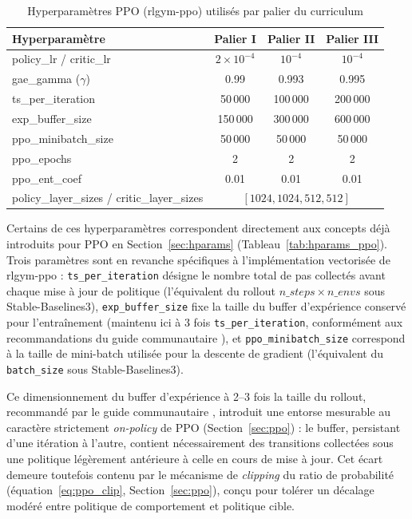 \begin{table}[h]
\centering
\small
\begin{tabular}{|l|c|c|c|}
\hline
\textbf{Hyperparamètre} & \textbf{Palier I} & \textbf{Palier II} & \textbf{Palier III} \\
\hline
policy\_lr / critic\_lr & $2 \times 10^{-4}$ & $10^{-4}$ & $10^{-4}$ \\
\hline
gae\_gamma ($\gamma$) & 0.99 & 0.993 & 0.995 \\
\hline
ts\_per\_iteration & 50\,000 & 100\,000 & 200\,000 \\
\hline
exp\_buffer\_size & 150\,000 & 300\,000 & 600\,000 \\
\hline
ppo\_minibatch\_size & 50\,000 & 50\,000 & 50\,000 \\
\hline
ppo\_epochs & 2 & 2 & 2 \\
\hline
ppo\_ent\_coef & 0.01 & 0.01 & 0.01 \\
\hline
policy\_layer\_sizes / critic\_layer\_sizes & \multicolumn{3}{c|}{$[1024, 1024, 512, 512]$} \\
\hline
\end{tabular}
\caption{Hyperparamètres PPO (rlgym-ppo) utilisés par palier du curriculum}
\label{tab:hp_ppo_curriculum}
\end{table}

Certains de ces hyperparamètres correspondent directement aux concepts déjà introduits pour PPO en Section~\ref{sec:hparams} (Tableau~\ref{tab:hparams_ppo}).
Trois paramètres sont en revanche spécifiques à l'implémentation vectorisée de rlgym-ppo : 
\texttt{ts\_per\_iteration} désigne le nombre total de pas collectés avant chaque mise à jour de politique (l'équivalent du rollout $n\_steps \times n\_envs$ sous Stable-Baselines3), 
\texttt{exp\_buffer\_size} fixe la taille du buffer d'expérience conservé pour l'entraînement (maintenu ici à 3 fois \texttt{ts\_per\_iteration}, conformément aux recommandations du guide communautaire \parencite{zealanlZealanLRLGymPPOGuide2026}), et \texttt{ppo\_minibatch\_size} correspond à la taille de mini-batch utilisée pour la descente de gradient (l'équivalent du \texttt{batch\_size} sous Stable-Baselines3).

Ce dimensionnement du buffer d'expérience à 2--3 fois la taille du rollout, recommandé par le guide communautaire \parencite{zealanlZealanLRLGymPPOGuide2026}, introduit une entorse mesurable au caractère strictement \textit{on-policy} de PPO (Section~\ref{sec:ppo}) : le buffer, persistant d'une itération à l'autre, contient nécessairement des transitions collectées sous une politique légèrement antérieure à celle en cours de mise à jour. Cet écart demeure toutefois contenu par le mécanisme de \textit{clipping} du ratio de probabilité (équation~\ref{eq:ppo_clip}, Section~\ref{sec:ppo}), conçu pour tolérer un décalage modéré entre politique de comportement et politique cible.


